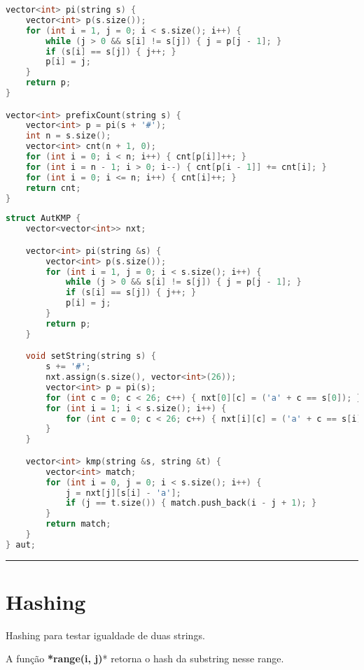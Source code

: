 \documentclass[11pt, a4paper, twoside]{book}
\begin{document}
\hfill

\begin{lstlisting}[language=C++]
vector<int> pi(string s) {
    vector<int> p(s.size());
    for (int i = 1, j = 0; i < s.size(); i++) {
        while (j > 0 && s[i] != s[j]) { j = p[j - 1]; }
        if (s[i] == s[j]) { j++; }
        p[i] = j;
    }
    return p;
}

vector<int> prefixCount(string s) {
    vector<int> p = pi(s + '#');
    int n = s.size();
    vector<int> cnt(n + 1, 0);
    for (int i = 0; i < n; i++) { cnt[p[i]]++; }
    for (int i = n - 1; i > 0; i--) { cnt[p[i - 1]] += cnt[i]; }
    for (int i = 0; i <= n; i++) { cnt[i]++; }
    return cnt;
}\end{lstlisting}

\hfill

\begin{lstlisting}[language=C++]
struct AutKMP {
    vector<vector<int>> nxt;

    vector<int> pi(string &s) {
        vector<int> p(s.size());
        for (int i = 1, j = 0; i < s.size(); i++) {
            while (j > 0 && s[i] != s[j]) { j = p[j - 1]; }
            if (s[i] == s[j]) { j++; }
            p[i] = j;
        }
        return p;
    }

    void setString(string s) {
        s += '#';
        nxt.assign(s.size(), vector<int>(26));
        vector<int> p = pi(s);
        for (int c = 0; c < 26; c++) { nxt[0][c] = ('a' + c == s[0]); }
        for (int i = 1; i < s.size(); i++) {
            for (int c = 0; c < 26; c++) { nxt[i][c] = ('a' + c == s[i]) ? i + 1 : nxt[p[i - 1]][c]; }
        }
    }

    vector<int> kmp(string &s, string &t) {
        vector<int> match;
        for (int i = 0, j = 0; i < s.size(); i++) {
            j = nxt[j][s[i] - 'a'];
            if (j == t.size()) { match.push_back(i - j + 1); }
        }
        return match;
    }
} aut;
\end{lstlisting}

\hfill

\rule{\textwidth}{0.4pt}

\section{Hashing}



Hashing para testar igualdade de duas strings.



A função \textbf{*range(i, j)}* retorna o hash da substring nesse range.   
\end{document}
